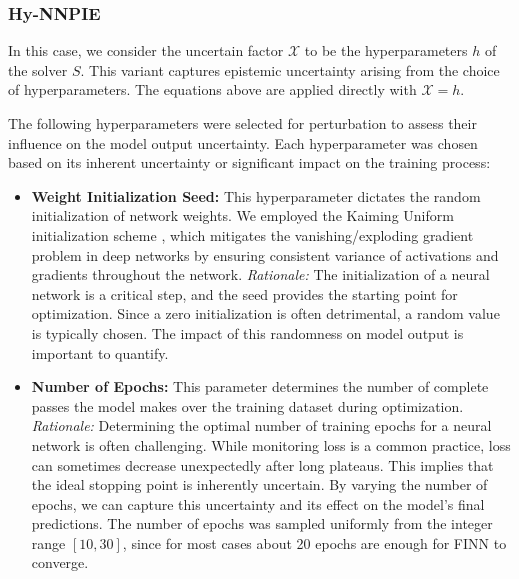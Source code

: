 \subsubsection{Hy-NNPIE}

In this case, we consider the uncertain factor $\mathcal{X}$ to be the hyperparameters $h$ of the solver $S$. This variant captures epistemic uncertainty arising from the choice of hyperparameters. The equations above are applied directly with $\mathcal{X} = h$.

The following hyperparameters were selected for perturbation to assess their influence on the model output uncertainty. Each hyperparameter was chosen based on its inherent uncertainty or significant impact on the training process:

\begin{itemize}
    \item \textbf{Weight Initialization Seed:} This hyperparameter dictates the random initialization of network weights. We employed the Kaiming Uniform initialization scheme \cite{he2015delving}, which mitigates the vanishing/exploding gradient problem in deep networks by ensuring consistent variance of activations and gradients throughout the network. \textit{Rationale:} The initialization of a neural network is a critical step, and the seed provides the starting point for optimization. Since a zero initialization is often detrimental, a random value is typically chosen. The impact of this randomness on model output is important to quantify.
    \item \textbf{Number of Epochs:} This parameter determines the number of complete passes the model makes over the training dataset during optimization. \textit{Rationale:} Determining the optimal number of training epochs for a neural network is often challenging. While monitoring loss is a common practice, loss can sometimes decrease unexpectedly after long plateaus. This implies that the ideal stopping point is inherently uncertain. By varying the number of epochs, we can capture this uncertainty and its effect on the model's final predictions. The number of epochs was sampled uniformly from the integer range $[10, 30]$, since for most cases about 20 epochs are enough for FINN to converge.

\end{itemize}
